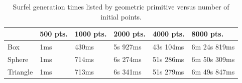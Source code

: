 \vfill
\begin{table}[h!]
   \centering
   \begin{tabular}{ | l | l | l | l | l | l | }
   \hline
   & 500 pts. & 1000 pts. & 2000 pts. & 4000 pts. & 8000 pts. \\ \hline
   Box & 1ms & 430ms & 5s 927ms & 43s 104ms & 6m 24s 819ms \\ \hline
   Sphere & 1ms & 714ms & 6s 274ms & 51s 286ms & 6m 50s 309ms \\ \hline
   Triangle & 1ms & 713ms & 6s 341ms & 51s 279ms & 6m 49s 847ms \\ \hline
   \end{tabular}
   \captionfonts
   \caption[Surfel generation times]{Surfel generation times listed by geometric primitive versus number of initial points.}
   \label{tbl:surf_gen_times}
\end{table}
\vfill
                        
